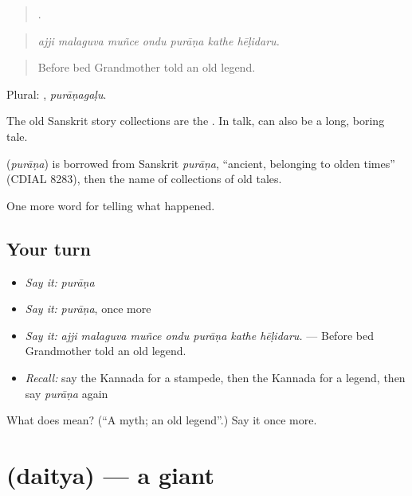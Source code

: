 \begin{quote}
      .
\end{quote}

\begin{quote}
\emph{ajji malaguva muñce ondu purāṇa kathe hēḷidaru.}
\end{quote}

\begin{quote}
Before bed Grandmother told an old legend.
\end{quote}

Plural: , \emph{purāṇagaḷu}.

The old Sanskrit story collections are the . In talk,  can also be a long, boring tale.

\begin{cousinweb}
\textbf{} (\emph{purāṇa}) is borrowed from Sanskrit \emph{purāṇa}, \textquotedblleft{}ancient, belonging to olden times\textquotedblright{} (CDIAL 8283), then the name of collections of old tales.
\end{cousinweb}

\begin{grammarlens}[title={What you've built}]
One more word for telling what happened.
\end{grammarlens}

\subsection*{Your turn}
\begin{itemize}
\raggedright
  \item \emph{Say it:} \emph{purāṇa}
  \item \emph{Say it:} \emph{purāṇa}, once more
  \item \emph{Say it:} \emph{ajji malaguva muñce ondu purāṇa kathe hēḷidaru.} — Before bed Grandmother told an old legend.
  \item \emph{Recall:} say the Kannada for a stampede, then the Kannada for a legend, then say \emph{purāṇa} again
\end{itemize}

\begin{tcolorbox}[breakable,colback=teal!4,colframe=teal!35!black,title={Before you move on}]
What does  mean? (\textquotedblleft{}A myth; an old legend\textquotedblright{}.) Say it once more.
\end{tcolorbox}
\section[\texorpdfstring{\kn{ದೈತ್ಯ} (daitya)}{ದೈತ್ಯ (daitya)}]{ (daitya) — a giant}

